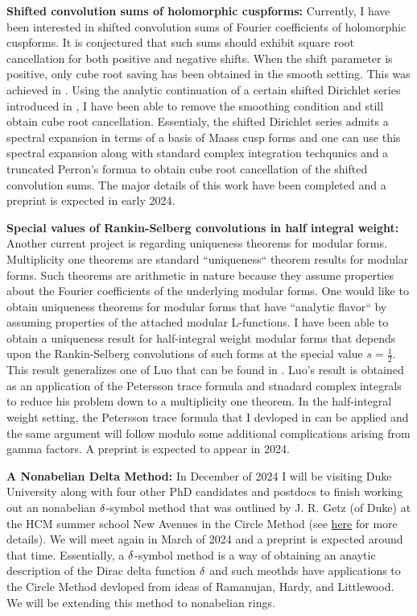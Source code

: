 \documentclass[12pt,reqno,oneside]{amsart}
\begin{document}
\textbf{Shifted convolution sums of holomorphic cuspforms:}
Currently, I have been interested in shifted convolution sums of Fourier coefficients of holomorphic cuspforms. It is conjectured that such sums should exhibit square root cancellation for both positive and negative shifts. When the shift parameter is positive, only cube root saving has been obtained in the smooth setting. This was achieved in \cite{HH}. Using the analytic continuation of a certain shifted Dirichlet series introduced in \cite{HH}, I have been able to remove the smoothing condition and still obtain cube root cancellation. Essentialy, the shifted Dirichlet series admits a spectral expansion in terms of a basis of Maass cusp forms and one can use this spectral expansion along with standard complex integration techqunics and a truncated Perron's formua to obtain cube root cancellation of the shifted convolution sums. The major details of this work have been completed and a preprint is expected in early 2024.

\textbf{Special values of Rankin-Selberg convolutions in half integral weight:}
Another current project is regarding uniqueness theorems for modular forms. Multiplicity one theorems are standard ``uniqueness`` theorem results for modular forms. Such theorems are arithmetic in nature because they assume properties about the Fourier coefficients of the underlying modular forms. One would like to obtain uniqueness theorems for modular forms that have ``analytic flavor`` by assuming properties of the attached modular L-functions. I have been able to obtain a uniqueness result for half-integral weight modular forms that depends upon the Rankin-Selberg convolutions of such forms at the special value $s = \frac{1}{2}$. This result generalizes one of Luo that can be found in \cite{L}. Luo's result is obtained as an application of the Petersson trace formula and stnadard complex integrals to reduce his problem down to a multiplicity one theorem. In the half-integral weight setting, the Petersson trace formula that I devloped in \cite{CT} can be applied and the same argument will follow modulo some additional complications arising from gamma factors. A preprint is expected to appear in 2024.

\textbf{A Nonabelian Delta Method:}
In December of 2024 I will be visiting Duke University along with four other PhD candidates and postdocs to finish working out an nonabelian $\delta$-symbol method that was outlined by J. R. Getz (of Duke) at the HCM summer school New Avenues in the Circle Method (see \href{https://www.hcm.uni-bonn.de/thecirclemethod2021/}{here} for more details). We will meet again in March of 2024 and a preprint is expected around that time. Essentially, a $\delta$-symbol method is a way of obtaining an anaytic description of the Dirac delta function $\delta$ and such meothds have applications to the Circle Method devloped from ideas of Ramanujan, Hardy, and Littlewood. We will be extending this method to nonabelian rings. 
\end{document}
